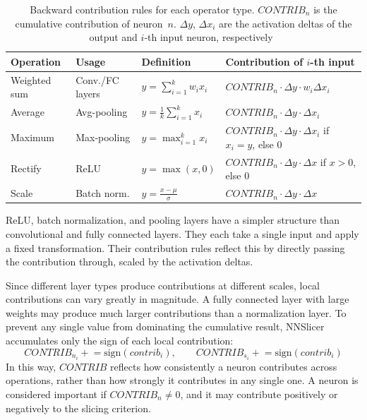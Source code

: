 \documentclass[
12pt,
fancyheadings,
a4paper,
twoside,
BCOR=0.7cm,
nobcorignoretitle,
grayscalebody,
]{stsreprt}
\begin{document}
\begin{table}[ht]
\centering
\caption{Backward contribution rules for each operator type. $\textit{CONTRIB}_n$ is the cumulative contribution of neuron~$n$. $\Delta y$, $\Delta x_i$ are the activation deltas of the output and $i$-th input neuron, respectively~\cite{zhang2020dynamic}}
\label{tab:operator_rules}
\small
\renewcommand{\arraystretch}{1.6}
\begin{tabular}{@{} l l l l @{}}
\toprule
\textbf{Operation} & \textbf{Usage} & \textbf{Definition} & \textbf{Contribution of $i$-th input} \\
\midrule
Weighted sum & Conv./FC layers & $y = \sum_{i=1}^{k} w_i x_i$ & $\textit{CONTRIB}_n \cdot \Delta y
\cdot w_i \Delta x_i$ \\
\hline
Average & Avg-pooling & $y = \frac{1}{k} \sum_{i=1}^{k} x_i$ & $\textit{CONTRIB}_n \cdot \Delta y
\cdot \Delta x_i$ \\
\hline
Maximum & Max-pooling & $y = \max_{i=1}^{k} x_i$ & $\textit{CONTRIB}_n \cdot \Delta y \cdot \Delta
x_i$ if $x_i = y$, else $0$ \\
\hline
Rectify & ReLU & $y = \max(x, 0)$ & $\textit{CONTRIB}_n \cdot \Delta y \cdot \Delta x$ if $x > 0$,
else $0$ \\
\hline
Scale & Batch norm. & $y = \frac{x - \mu}{\sigma}$ & $\textit{CONTRIB}_n \cdot \Delta y \cdot
\Delta x$ \\
\bottomrule
\end{tabular}
\renewcommand{\arraystretch}{1.0}
\end{table}

ReLU, batch normalization, and pooling layers have a simpler structure than convolutional and fully
connected layers.
They each take a single input and apply a fixed transformation.
Their contribution rules reflect this by directly passing the contribution through, scaled by the
activation deltas.

Since different layer types produce contributions at different scales, local contributions can vary
greatly in magnitude.
A fully connected layer with large weights may produce much larger contributions than a
normalization layer.
To prevent any single value from dominating the cumulative result, NNSlicer accumulates only the
sign of each local contribution:
\begin{equation}
    \textit{CONTRIB}_{n_i} \mathrel{+}= \text{sign}(\textit{contrib}_i), \qquad
    \textit{CONTRIB}_{s_i} \mathrel{+}= \text{sign}(\textit{contrib}_i)
\end{equation}
In this way, $\textit{CONTRIB}$ reflects how consistently a neuron contributes across operations,
rather than how strongly it contributes in any single one.
A neuron is considered important if $\textit{CONTRIB}_n \neq 0$, and it may contribute positively
or negatively to the slicing criterion.
\end{document}
